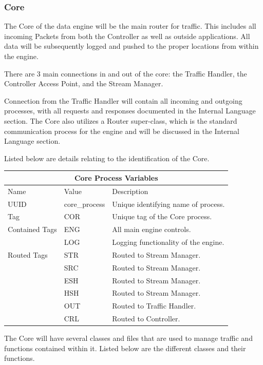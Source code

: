 \documentclass{article}
\begin{document}
\cleardoublepage
\subsubsection{Core}
The Core of the data engine will be the main router for traffic. This includes all incoming Packets from both the Controller as well as outside applications. All data will be subsequently logged and pushed to the proper locations from within the engine.

There are 3 main connections in and out of the core: the Traffic Handler, the Controller Access Point, and the Stream Manager.

Connection from the Traffic Handler will contain all incoming and outgoing processes, with all requests and responses documented in the Internal Language section. The Core also utilizes a Router super-class, which is the standard communication process for the engine and will be discussed in the Internal Language section.

Listed below are details relating to the identification of the Core.

\begin{center}
\begin{tabular}{ | p{5cm} || p{4cm} | p{6cm} | }
\hline
\multicolumn{3}{|c|}{Core Process Variables}\\
\hline
Name & Value & Description\\
\hline
UUID & core\_process & Unique identifying name of process.\\
\hline
Tag & COR & Unique tag of the Core process.\\
\hline
Contained Tags & ENG & All main engine controls.\\
& LOG & Logging functionality of the engine.\\
\hline
Routed Tags & STR & Routed to Stream Manager.\\
 & SRC & Routed to Stream Manager.\\
 & ESH & Routed to Stream Manager.\\
 & HSH & Routed to Stream Manager.\\
 & OUT & Routed to Traffic Handler.\\
 & CRL & Routed to Controller.\\
\hline
\end{tabular}
\end{center}

The Core will have several classes and files that are used to manage traffic and functions contained within it. Listed below are the different classes and their functions.
\end{document}
